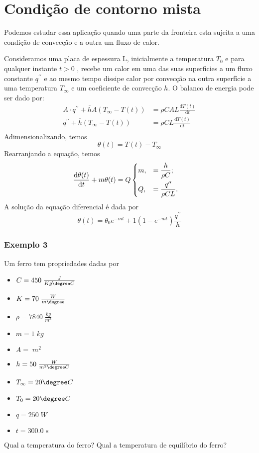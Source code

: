 \section{Condição de contorno mista}
Podemos estudar essa aplicação quando uma parte da fronteira esta sujeita a uma condição de
convecção e a outra um fluxo de calor. \par

Consideramos uma placa de espessura L, inicialmente a temperatura \(T_0\) e para qualquer instante
\(t>0\) , recebe um calor em uma das suas superficies a um fluxo constante \(q^{\prime \prime}\) e
ao mesmo tempo dissipe calor por convecção na outra superfície a uma temperatura \(T_{\infty}\) e
um coeficiente de convecção \(h\). O balanco de energia pode ser dado por:
\begin{align}
    A \cdot q^{\prime \prime} + \overline{h} A (T_\infty - T(t)) &= \rho C A L \frac{\mathrm{d}T(t)}{\mathrm{d}t}\\
    q^{\prime \prime} + \overline{h} (T_\infty - T(t)) &= \rho C L \frac{\mathrm{d}T(t)}{\mathrm{d}t}\\ 
\end{align}
Adimensionalizando, temos
\begin{equation}
    \theta (t) = T(t) - T_{\infty}
\end{equation}
Rearranjando a equação, temos
\begin{align}
    \frac{\mathrm{d}\theta (t)}{\mathrm{d}t} + m \theta (t) &= Q
     \begin{dcases}
     m, &= \frac{h}{\rho C} ;\\
     Q, &=\frac{q^{\prime \prime}}{\rho C L} .\\
     \end{dcases}
\end{align}
A solução da equação diferencial é dada por
\begin{equation}
    \theta (t) = \theta_0 e^{-mt} + 1 \left( 1 - e^{-mt} \right) \frac{q^{\prime\prime} }{h} 
\end{equation}
\subsubsection{Exemplo 3}
Um ferro tem propriedades dadas por
\begin{itemize}
    \item \(C = 450 \; \frac{J}{Kg \degree C}\)
    \item \(K = 70 \; \frac{W}{m \degree}\) 
    \item \(\rho = 7840 \; \frac{kg}{m^{3} }\) 
    \item \(m = 1 \; kg\)
    \item \(A =\; m ^{2} \) 
    \item \(h = 50 \; \frac{W}{m^{2} \degree C}\)
    \item \(T_\infty = 20 \degree C\) 
    \item \(T_0 = 20 \degree C\)
    \item \(q = 250 \; W\)
    \item \(t = 300.0 \; s\)    
\end{itemize}
Qual a temperatura do ferro? Qual a temperatura de equilíbrio do ferro? 
